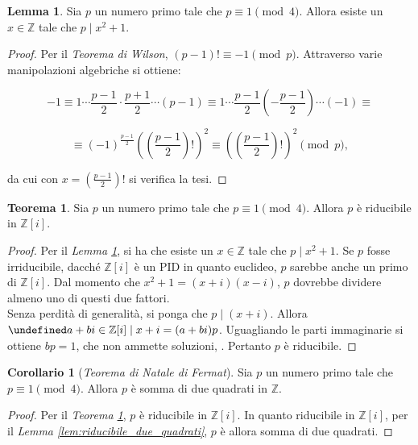 \documentclass[a4paper]{article}
\newcommand{\ZZ}{\mathbb{Z}}
\newcommand{\ZZi}{\mathbb{Z}[i]}
\theoremstyle{definition}
\newtheorem{corollary}{Corollario}[section]
\newtheorem{lemma}{Lemma}[section]
\newtheorem{theorem}{Teorema}[section]
\let\oldexists\exists
\let\exists\undefined
\DeclareMathOperator{\exists}{\oldexists}
\begin{document}
\begin{lemma}
    \label{lem:quadrato_mod_4}
    Sia $p$ un numero primo tale che $p \equiv 1 \pmod4$. Allora
    esiste un $x \in \ZZ$ tale che $p \mid x^2+1$.
\end{lemma}

\begin{proof}
    Per il \textit{Teorema di Wilson}, $(p-1)! \equiv -1 \pmod p$.
    Attraverso varie manipolazioni algebriche si ottiene:

    \[-1 \equiv 1 \cdots \frac{p-1}{2} \cdot \frac{p+1}{2} \cdots (p-1) \equiv 1 \cdots \frac{p-1}{2} \left(-\frac{p-1}{2}\right) \cdots (-1) \equiv\]

    \[ \equiv (-1)^{\frac{p-1}{2}} \left(\left( \frac{p-1}{2} \right)!\right)^2 \equiv
        \left(\left( \frac{p-1}{2} \right)!\right)^2 \pmod p,
    \]

    \vskip 0.1in

    da cui con $x = \left( \frac{p-1}{2} \right)!$ si verifica la
    tesi.
\end{proof}

\begin{theorem}
    \label{th:primo_1_mod_4_riducibile}
    Sia $p$ un numero primo tale che $p \equiv 1 \pmod4$. Allora
    $p$ è riducibile in $\ZZi$.
\end{theorem}

\begin{proof}
    Per il \textit{Lemma \ref{lem:quadrato_mod_4}}, si ha che esiste
    un $x \in \ZZ$ tale che $p \mid x^2+1$. Se $p$ fosse irriducibile,
    dacché $\ZZi$ è un PID in quanto euclideo, $p$ sarebbe anche un
    primo di $\ZZi$. Dal momento che $x^2+1=(x+i)(x-i)$, $p$ dovrebbe
    dividere almeno uno di questi due fattori. \\

    Senza perdità di generalità, si ponga che $p \mid (x+i)$. Allora
    $\exists a+bi \in \ZZi \mid x+i=(a+bi)p$. Uguagliando le parti
    immaginarie si ottiene $bp=1$, che non ammette soluzioni, \Lightning{}. Pertanto $p$ è riducibile.
\end{proof}

\begin{corollary}[\textit{Teorema di Natale di Fermat}]
    \label{th:teorema_natale}
    Sia $p$ un numero primo tale che $p \equiv 1 \pmod4$. Allora
    $p$ è somma di due quadrati in $\ZZ$.
\end{corollary}

\begin{proof}
    Per il \textit{Teorema \ref{th:primo_1_mod_4_riducibile}},
    $p$ è riducibile in $\ZZi$. In quanto riducibile in $\ZZi$, per
    il \textit{Lemma \ref{lem:riducibile_due_quadrati}}, $p$ è allora
    somma di due quadrati.
\end{proof}
\end{document}
